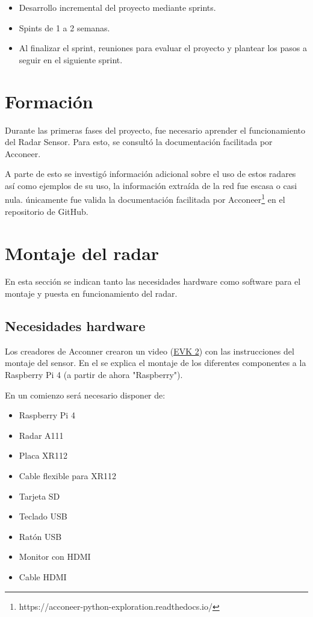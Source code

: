 \begin{itemize}
\item Desarrollo incremental del proyecto mediante sprints. \item Spints de 1 a 2 semanas. 
\item Al finalizar el sprint, reuniones para evaluar el proyecto y plantear los pasos a seguir en el siguiente sprint.
\end{itemize}

\section{Formación}
Durante las primeras fases del proyecto, fue necesario aprender el funcionamiento del Radar Sensor. Para esto, se consultó la documentación facilitada por Acconeer.

A parte de esto se investigó información adicional sobre el uso de estos radares así como ejemplos de su uso, la información extraída de la red fue escasa o casi nula. únicamente fue valida la documentación facilitada por Acconeer\footnote{https://acconeer-python-exploration.readthedocs.io/} en el repositorio de GitHub.

\section{Montaje del radar}

En esta sección se indican tanto las necesidades hardware como software para el montaje y puesta en funcionamiento del radar.

\subsection{Necesidades hardware}
Los creadores de Acconner crearon un video (\href{https://www.youtube.com/watch?v=0uKrm_RAV_c}{EVK 2}) con las instrucciones del montaje del sensor. En el se explica el montaje de los diferentes componentes a la Raspberry Pi 4 (a partir de ahora "Raspberry"). 

En un comienzo será necesario disponer de: 
\begin{itemize}
\item Raspberry Pi 4
\item Radar A111
\item Placa XR112
\item Cable flexible para XR112
\item Tarjeta SD
\item Teclado USB
\item Ratón USB
\item Monitor con HDMI
\item Cable HDMI
\end{itemize}

